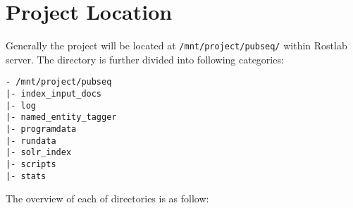 
\section{Project Location}

Generally the project will be located at \texttt{/mnt/project/pubseq/} within Rostlab server. The directory is further divided into following categories:

\begin{verbatim}
- /mnt/project/pubseq
|- index_input_docs
|- log
|- named_entity_tagger
|- programdata
|- rundata
|- solr_index
|- scripts
|- stats 
\end{verbatim}

The overview of each of directories is as follow:

